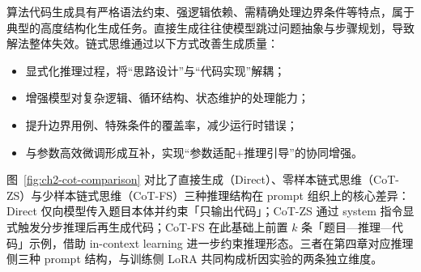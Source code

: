 
算法代码生成具有严格语法约束、强逻辑依赖、需精确处理边界条件等特点，属于典型的高度结构化生成任务。直接生成往往使模型跳过问题抽象与步骤规划，导致解法整体失效。链式思维通过以下方式改善生成质量：
\begin{itemize}
    \item 显式化推理过程，将“思路设计”与“代码实现”解耦；
    \item 增强模型对复杂逻辑、循环结构、状态维护的处理能力；
    \item 提升边界用例、特殊条件的覆盖率，减少运行时错误；
    \item 与参数高效微调形成互补，实现“参数适配+推理引导”的协同增强。
\end{itemize}

图~\ref{fig:ch2-cot-comparison} 对比了直接生成（Direct）、零样本链式思维（CoT-ZS）与少样本链式思维（CoT-FS）三种推理结构在 prompt 组织上的核心差异：Direct 仅向模型传入题目本体并约束「只输出代码」；CoT-ZS 通过 system 指令显式触发分步推理后再生成代码；CoT-FS 在此基础上前置 $k$ 条「题目—推理—代码」示例，借助 in-context learning 进一步约束推理形态。三者在第四章对应推理侧三种 prompt 结构，与训练侧 LoRA 共同构成析因实验的两条独立维度。

